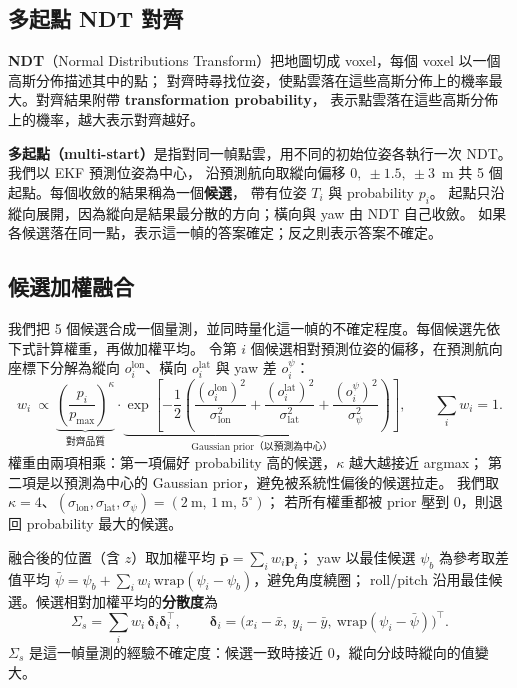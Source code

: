 \documentclass[11pt, a4paper]{article}
\begin{document}
\subsection{多起點 NDT 對齊}
\textbf{NDT}（Normal Distributions Transform）把地圖切成 voxel，每個 voxel 以一個高斯分佈描述其中的點；
對齊時尋找位姿，使點雲落在這些高斯分佈上的機率最大。對齊結果附帶 \textbf{transformation probability}，
表示點雲落在這些高斯分佈上的機率，越大表示對齊越好。

\textbf{多起點（multi-start）}是指對同一幀點雲，用不同的初始位姿各執行一次 NDT。我們以 EKF 預測位姿為中心，
沿預測航向取縱向偏移 $0,\ \pm1.5,\ \pm3$~m 共 5 個起點。每個收斂的結果稱為一個\textbf{候選}，
帶有位姿 $T_i$ 與 probability $p_i$。
起點只沿縱向展開，因為縱向是結果最分散的方向；橫向與 yaw 由 NDT 自己收斂。
如果各候選落在同一點，表示這一幀的答案確定；反之則表示答案不確定。

\subsection{候選加權融合}
我們把 5 個候選合成一個量測，並同時量化這一幀的不確定程度。每個候選先依下式計算權重，再做加權平均。
令第 $i$ 個候選相對預測位姿的偏移，在預測航向座標下分解為縱向 $o_i^{\mathrm{lon}}$、橫向 $o_i^{\mathrm{lat}}$ 與 yaw 差 $o_i^{\psi}$：
\begin{equation}
w_i\ \propto\ \underbrace{\left(\frac{p_i}{p_{\max}}\right)^{\kappa}}_{\text{對齊品質}}
\cdot\underbrace{\exp\!\left[-\frac12\left(\frac{(o_i^{\mathrm{lon}})^2}{\sigma_{\mathrm{lon}}^2}
+\frac{(o_i^{\mathrm{lat}})^2}{\sigma_{\mathrm{lat}}^2}
+\frac{(o_i^{\psi})^2}{\sigma_{\psi}^2}\right)\right]}_{\text{Gaussian prior（以預測為中心）}},\qquad \sum_i w_i=1.
\end{equation}
權重由兩項相乘：第一項偏好 probability 高的候選，$\kappa$ 越大越接近 argmax；
第二項是以預測為中心的 Gaussian prior，避免被系統性偏後的候選拉走。
我們取 $\kappa=4$、$(\sigma_{\mathrm{lon}},\sigma_{\mathrm{lat}},\sigma_{\psi})=(2~\text{m},\,1~\text{m},\,5^{\circ})$；
若所有權重都被 prior 壓到 0，則退回 probability 最大的候選。

融合後的位置（含 $z$）取加權平均 $\bar{\mathbf p}=\sum_i w_i\mathbf p_i$；
yaw 以最佳候選 $\psi_b$ 為參考取差值平均 $\bar\psi=\psi_b+\sum_i w_i\,\mathrm{wrap}(\psi_i-\psi_b)$，避免角度繞圈；
roll/pitch 沿用最佳候選。候選相對加權平均的\textbf{分散度}為
\begin{equation}
\Sigma_s=\sum_i w_i\,\boldsymbol\delta_i\boldsymbol\delta_i^{\top},\qquad
\boldsymbol\delta_i=\bigl(x_i-\bar x,\ y_i-\bar y,\ \mathrm{wrap}(\psi_i-\bar\psi)\bigr)^{\top}.
\end{equation}
$\Sigma_s$ 是這一幀量測的經驗不確定度：候選一致時接近 0，縱向分歧時縱向的值變大。
\end{document}
